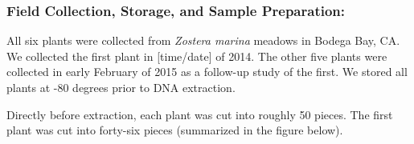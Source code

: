 
\subsubsection{Field Collection, Storage, and Sample Preparation:}

All six plants were collected from \textit{Zostera marina} meadows in Bodega Bay, CA. We collected the first plant in [time/date] of 2014. The other five plants were collected in early February of 2015 as a follow-up study of the first. We stored all plants at -80 degrees prior to DNA extraction. 

Directly before extraction, each plant was cut into roughly 50 pieces. The first plant was cut into forty-six pieces (summarized in the figure below). 
